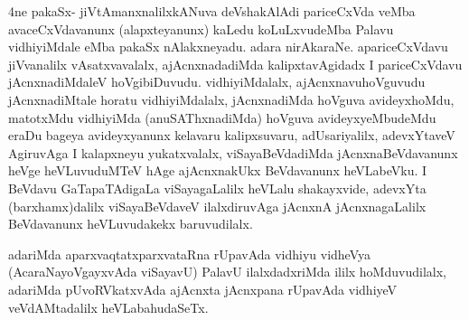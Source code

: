 \begin{artha}
4ne pakaSx- jiVtAmanxnalilxkANuva deVshakAlAdi pariceCxVda veMba
avaceCxVdavanunx (alapxteyanunx) kaLedu koLuLxvudeMba Palavu
vidhiyiMdale eMba pakaSx nAlakxneyadu. adara
nirAkaraNe. apariceCxVdavu jiVvanalilx vAsatxvavalalx, ajAcnxnadadiMda
kalipxtavAgidadx I pariceCxVdavu jAcnxnadiMdaleV
hoVgibiDuvudu. vidhiyiMdalalx, ajAcnxnavuhoVguvudu jAcnxnadiMtale
horatu vidhiyiMdalalx, jAcnxnadiMda hoVguva avideyxhoMdu, matotxMdu
vidhiyiMda (anuSAThxnadiMda) hoVguva avideyxyeMbudeMdu eraDu bageya
avideyxyanunx kelavaru kalipxsuvaru, adUsariyalilx, adevxYtaveV
AgiruvAga I kalapxneyu yukatxvalalx, viSayaBeVdadiMda
jAcnxnaBeVdavanunx heVge heVLuvuduMTeV hAge ajAcnxnakUkx BeVdavanunx
heVLabeVku. I BeVdavu GaTapaTAdigaLa viSayagaLalilx heVLalu
shakayxvide, adevxYta (barxhamx)dalilx viSayaBeVdaveV ilalxdiruvAga
jAcnxnA jAcnxnagaLalilx BeVdavanunx heVLuvudakekx baruvudilalx.

adariMda aparxvaqtatxparxvataRna rUpavAda vidhiyu vidheVya
(AcaraNayoVgayxvAda viSayavU) PalavU ilalxdadxriMda ililx
hoMduvudilalx, adariMda pUvoRVkatxvAda ajAcnxta jAcnxpana rUpavAda
vidhiyeV veVdAMtadalilx heVLabahudaSeTx.
\end{artha}

\begin{center}


\end{center}

